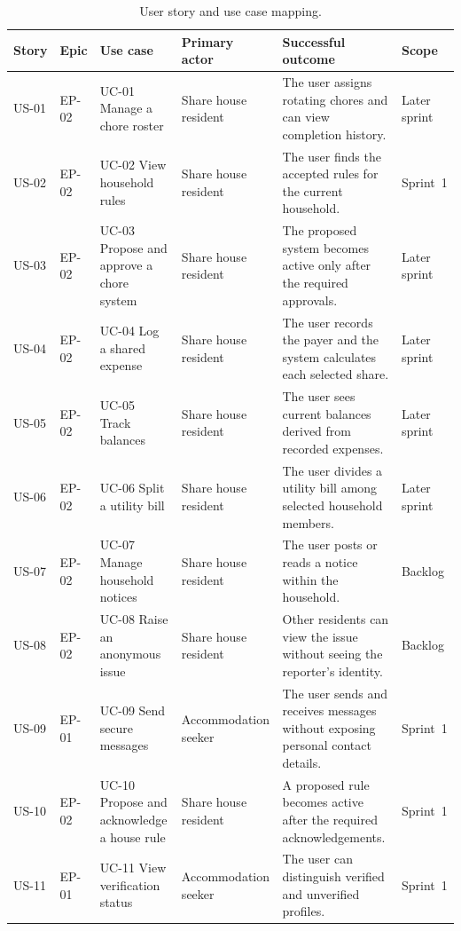 \documentclass[11pt,a4paper]{article}
\begin{document}
\begin{table}[H]
    \centering
    \scriptsize
    \caption{User story and use case mapping.}
    \begin{tabularx}{\textwidth}{@{}L{0.9cm}L{0.9cm}L{3.0cm}L{2.3cm}Y L{1.4cm}@{}}
        \toprule
        Story & Epic & Use case & Primary actor & Successful outcome & Scope\\
        \midrule
        US-01 & EP-02 & UC-01 Manage a chore roster & Share house resident & The user assigns rotating chores and can view completion history. & Later sprint\\
        US-02 & EP-02 & UC-02 View household rules & Share house resident & The user finds the accepted rules for the current household. & Sprint~1\\
        US-03 & EP-02 & UC-03 Propose and approve a chore system & Share house resident & The proposed system becomes active only after the required approvals. & Later sprint\\
        US-04 & EP-02 & UC-04 Log a shared expense & Share house resident & The user records the payer and the system calculates each selected share. & Later sprint\\
        US-05 & EP-02 & UC-05 Track balances & Share house resident & The user sees current balances derived from recorded expenses. & Later sprint\\
        US-06 & EP-02 & UC-06 Split a utility bill & Share house resident & The user divides a utility bill among selected household members. & Later sprint\\
        US-07 & EP-02 & UC-07 Manage household notices & Share house resident & The user posts or reads a notice within the household. & Backlog\\
        US-08 & EP-02 & UC-08 Raise an anonymous issue & Share house resident & Other residents can view the issue without seeing the reporter's identity. & Backlog\\
        US-09 & EP-01 & UC-09 Send secure messages & Accommodation seeker & The user sends and receives messages without exposing personal contact details. & Sprint~1\\
        US-10 & EP-02 & UC-10 Propose and acknowledge a house rule & Share house resident & A proposed rule becomes active after the required acknowledgements. & Sprint~1\\
        US-11 & EP-01 & UC-11 View verification status & Accommodation seeker & The user can distinguish verified and unverified profiles. & Sprint~1\\

\end{tabularx}
\end{table}
\end{document}
